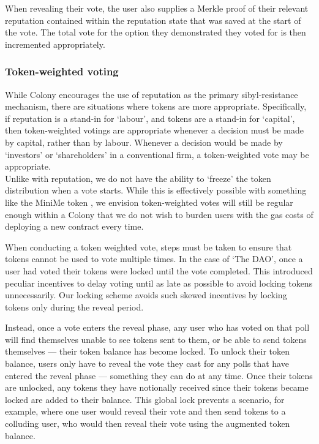 When revealing their vote, the user also supplies a Merkle proof of their relevant reputation contained within the reputation state that was saved at the start of the vote. The total vote for the option they demonstrated they voted for is then incremented appropriately.

\subsubsection*{Token-weighted voting}

While Colony encourages the use of reputation as the primary sibyl-resistance mechanism, there are situations where tokens are more appropriate. Specifically, if reputation is a stand-in for `labour', and tokens are a stand-in for `capital', then token-weighted votings are appropriate whenever a decision must be made by capital, rather than by labour. Whenever a decision would be made by `investors' or `shareholders' in a conventional firm, a token-weighted vote may be appropriate. \\

Unlike with reputation, we do not have the ability to `freeze' the token distribution when a vote starts. While this is effectively possible with something like the MiniMe token \cite{minime}, we envision token-weighted votes will still be regular enough within a Colony that we do not wish to burden users with the gas costs of deploying a new contract every time.

When conducting a token weighted vote, steps must be taken to ensure that tokens cannot be used to vote multiple times. In the case of `The DAO', once a user had voted their tokens were locked until the vote completed. This introduced peculiar incentives to delay voting until as late as possible to avoid locking tokens unnecessarily.  Our locking scheme avoids such skewed incentives by locking tokens only during the reveal period.

Instead, once a vote enters the reveal phase, any user who has voted on that poll will find themselves unable to see tokens sent to them, or be able to send tokens themselves --- their token balance has become locked. To unlock their token balance, users only have to reveal the vote they cast for any polls that have entered the reveal phase --- something they can do at any time. Once their tokens are unlocked, any tokens they have notionally received since their tokens became locked are added to their balance. This global lock prevents a scenario, for example, where one user would reveal their vote and then send tokens to a colluding user, who would then reveal their vote using the augmented token balance.

